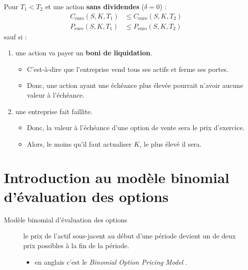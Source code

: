 \documentclass[10pt, french]{article}
\begin{document}
\begin{multicols*}{2}
Pour $T_{1}	<	T_{2}$ et une action \textbf{sans dividendes} ($\delta	=	0$) : 
\begin{align*}
	C_{\text{euro}}(S, K, T_{1})	&\leq	C_{\text{euro}}(S, K, T_{2})	\\
	P_{\text{euro}}(S, K, T_{1})	&\leq	P_{\text{euro}}(S, K, T_{2})
\end{align*}
sauf si :
\begin{enumerate}
	\item	une action va payer un \textbf{boni de liquidation}.
		\begin{itemize}
		\item	C'est-à-dire que l'entreprise vend tous ses actifs et ferme ses portes.
		\item	Donc, une action ayant une échéance plus élevée pourrait n'avoir aucune valeur à l'échéance.
		\end{itemize}
	\item	une entreprise fait faillite.
		\begin{itemize}
		\item	Donc, la valeur à l'échéance d'une option de vente sera le prix d'exercice.
		\item	Alors, le moins qu'il faut actualiser $K$, le plus élevé il sera.
		\end{itemize}
\end{enumerate}


\newpage
\section{Introduction au modèle binomial d'évaluation des options}

\begin{description}
	\item[Modèle binomial d'évaluation des options]	le prix de l'actif sous-jacent au début d'une période devient un de deux prix possibles à la fin de la période.
		\begin{itemize}
		\item	en anglais c'est le \og \textit{Binomial Option Pricing Model} \fg{}.
		\end{itemize}
\end{description}


\end{multicols*}
\end{document}
